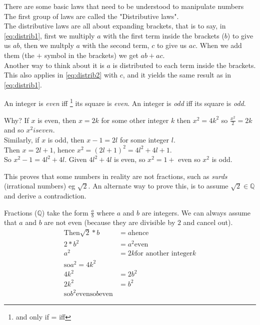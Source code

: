 There are some basic laws that need to be understood to manipulate numbers
The first group of laws are called the "Distributive laws".
\\
The distributive laws are all about expanding brackets, that is to say, in
\ref{eq:distrib1}, first we multiply $a$ with the first term inside the
brackets ($b$) to give us $ab$, then we multply $a$ with the second term, $c$
to give us $ac$. When we add them (the $+$ symbol in the brackets) we get
$ab + ac$.
\\
Another way to think about it is $a$ is distributed to each term inside the
brackets. This also applies in \ref{eq:distrib2} with $c$, and it yields the 
same result as in \ref{eq:distrib1}.

An integer is \emph{even} iff \footnote{and only if = iff} its square is
\emph{even}. An integer is \emph{odd} iff its square is \emph{odd}.

Why? If $x$ is even, then $x = 2k$ for some other integer $k$ then $x^2 = 4k^2$
so $\frac{x^2}{2} = 2k$ and so $x^2 is even$.\\
Similarly, if $x$ is odd, then $x-1 = 2l$ for some integer $l$. \\
Then $x = 2l + 1$, hence $x^2 = (2l +1)^2 = 4l^2 + 4l + 1$. \\
So $x^2 - 1 = 4l^2 + 4l$. Given $4l^2 + 4l$ is even, so $x^2 = 1 + $ even so
$x^2$ is odd.

This proves that some numbers in reality are not fractions, such as \emph{surds}
(irrational numbers) eg $\sqrt{2}$. An alternate way to prove this, is to assume
$\sqrt{2} \in \mathbb{Q}$ and derive a contradiction.

Fractions ($\mathbb{Q}$) take the form $\frac{a}{b}$ where $a$ and $b$ are
integers. We can always assume that $a$ and $b$ are not even (because they are
divisible by $2$ and cancel out).
\begin{align}
  \text{Then} \sqrt{2}*b & = a \text{hence} \\
  2* b^2 & = a^2 \text{even} \\
  a^2 & = 2k \text{for another integer} k \\
  \text{so} a^2 = 4k^2 \\
  4k^2 & = 2b^2 \\
  2k^2 & = b^2 \\
  \text{so} b^2 \text{even}
  \text{so} b \text{even}
\end{align}

